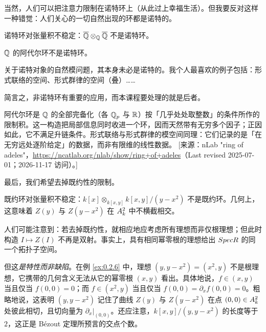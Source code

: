 当然，人们可以把注意力限制在诺特环上（从此过上幸福生活）。但我要反对这样一种错觉：人们关心的一切自然出现的环都是诺特的。

\begin{example}\label{ex:0.2.3}
诺特环对张量积不稳定：$\overline{\mathbb{Q}} \otimes_{\mathbb{Q}} \overline{\mathbb{Q}}$ 不是诺特环。
\end{example}

\begin{example}\label{ex:0.2.4}
$\mathbb{Q}$ 的阿代尔环不是诺特环。
\end{example}

\begin{example}\label{ex:0.2.5}
关于诺特对象的自然模问题，其本身未必是诺特的。我个人最喜欢的例子包括：形式联络的空间、形式群律的空间（叠）……
\end{example}

简言之，非诺特环有重要的应用，而本课程要处理的就是后者。

\begin{yizhu}
阿代尔环是 $\mathbb{Q}$ 的全部完备化（各 $\mathbb{Q}_p$ 与 $\mathbb{R}$）按「几乎处处取整数」的条件所作的限制积。这一构造把局部信息同时收进一个环，因而天然带有无穷多个因子；正因如此，它不满足升链条件。形式联络与形式群律的模空间同理：它们记录的是「在无穷远处逐阶给定」的数据，而非有限维的线性数据。
[来源：nLab "ring of adeles"，\url{https://ncatlab.org/nlab/show/ring+of+adeles}（Last revised 2025-07-01；2026-11-17 访问）。]
\end{yizhu}

最后，我们希望去掉既约性的限制。

\begin{example}\label{ex:0.2.6}
既约环对张量积不稳定：$k[x] \otimes_{k[x,y]} k[x,y]/(y-x^2)$ 不是既约环。几何上，这意味着 $Z(y)$ 与 $Z(y-x^2)$ 在 $A^2_k$ 中不横截相交。
\end{example}

人们可能注意到：若去掉既约性，就相应地应考虑所有理想而非仅根理想；但此时构造 $I \mapsto Z(I)$ 不再是双射。事实上，具有相同幂零根的理想给出 $Spec R$ 的同一个拓扑子空间。

但这\emph{是特性而非缺陷}。在例 \ref{ex:0.2.6} 中，理想 $(y,y-x^2) = (x^2,y)$ 不是根理想，它携带的几何含义无法从它的幂零根 $(x,y)$ 看出。具体地说，$f \in (x,y)$ 当且仅当 $f(0,0) = 0$；而 $f \in (x^2,y)$ 当且仅当 $f(0,0) = \partial_x f(0,0) = 0$。粗略地说，这表明 $(y,y-x^2)$ 记住了曲线 $Z(y)$ 与 $Z(y-x^2)$ 在点 $(0,0) \in A^2_k$ 处彼此相切，且切向量为 $\partial_x|_{(0,0)}$。还应注意，$k[x,y]/(y,y-x^2)$ 的长度等于 $2$，这正是 Bézout 定理所预言的交点个数。

